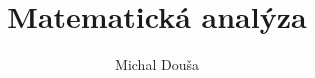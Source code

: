 \documentclass{book}
\title{Matematická analýza}
\author{Michal Douša}
\date{}
\begin{document}
\begin{titlepage}
    \maketitle
\end{titlepage}

\tableofcontents



    
\end{document}

